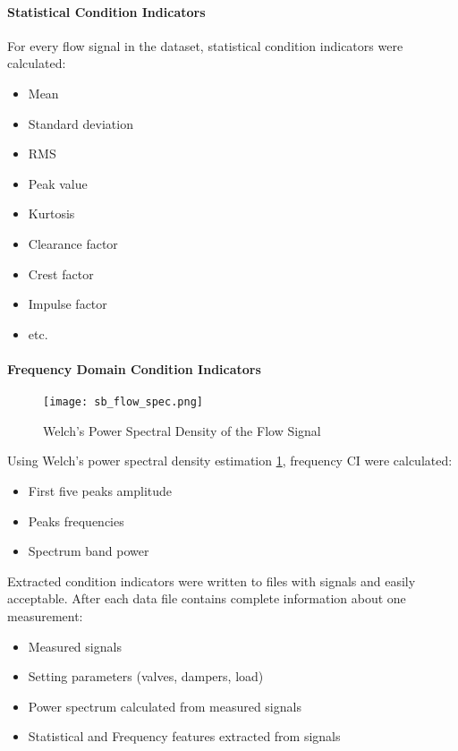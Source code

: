 \paragraph{Statistical Condition Indicators}

For every flow signal in the dataset, statistical condition indicators were calculated: 
\begin{itemize}
    \item Mean
    \item Standard deviation
    \item RMS
    \item Peak value
    \item Kurtosis
    \item Clearance factor
    \item Crest factor
    \item Impulse factor
    \item etc.
\end{itemize}


\paragraph{Frequency Domain Condition Indicators}

\begin{figure}[h!]
    \centering
    \texttt{[image: sb\_flow\_spec.png]}
    \caption{Welch's Power Spectral Density of the Flow Signal}
    \label{fig:flow_sp}
\end{figure}


Using Welch's power spectral density estimation \ref{fig:flow_sp}, frequency CI were
calculated: 

\begin{itemize}
\item First five peaks amplitude
\item Peaks frequencies
\item Spectrum band power
\end{itemize}


Extracted condition indicators were written to files with signals and
easily acceptable. After each data file contains complete information about
one measurement:
\begin{itemize}
    \item Measured signals
    \item Setting parameters (valves, dampers, load)
    \item Power spectrum calculated from measured signals
    \item Statistical and Frequency features extracted from signals
\end{itemize}

